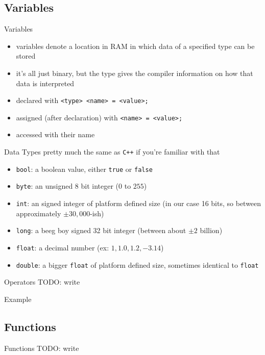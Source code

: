 \documentclass{beamer}
\newcommand{\cxx}{\texttt{C++}\xspace}
\newcommand{\examplefile}[1]{
	
}
\begin{document}
	\subsection{Variables}
	\begin{frame}[fragile]{Variables}
		\begin{itemize}
			\item variables denote a location in RAM in which data of a specified type can be stored
			\item it's all just binary, but the type gives the compiler information on how that data is interpreted
			\item declared with \verb|<type> <name> = <value>;|
			\item assigned (after declaration) with \verb|<name> = <value>;|
			\item accessed with their name
		\end{itemize}
	\end{frame}

	\begin{frame}[fragile]{Data Types}
		pretty much the same as \cxx if you're familiar with that
		\begin{itemize}
			\item \verb|bool|: a boolean value, either \verb|true| or \verb|false|
			\item \verb|byte|: an unsigned 8 bit integer ($0$ to $255$)
			\item \verb|int|: an signed integer of platform defined size (in our case 16 bits, so between approximately $\pm30,000$-ish)
			\item \verb|long|: a beeg boy signed 32 bit integer (between about $\pm2$ billion)
			\item \verb|float|: a decimal number (ex: $1, 1.0, 1.2, -3.14$)
			\item \verb|double|: a bigger \verb|float| of platform defined size, sometimes identical to \verb|float|
		\end{itemize}
	\end{frame}

	\begin{frame}{Operators}
		TODO: write
	\end{frame}

	\begin{frame}[fragile]{Example}
		\examplefile{variables.cxx}
	\end{frame}

	\subsection{Functions}
	\begin{frame}{Functions}
		TODO: write
	\end{frame}
\end{document}
